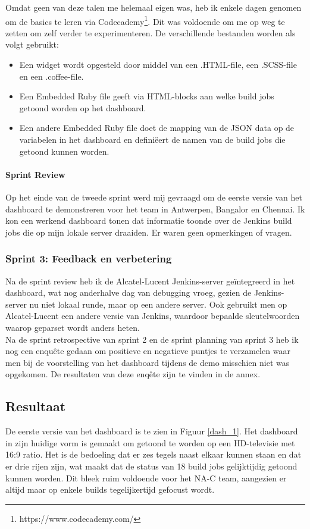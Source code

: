 \documentclass[10pt,a4paper]{article}
\begin{document}
Omdat geen van deze talen me helemaal eigen was, heb ik enkele dagen genomen om de basics te leren via Codecademy\footnote{https://www.codecademy.com/}. Dit was voldoende om me op weg te zetten om zelf verder te experimenteren. 
De verschillende bestanden worden als volgt gebruikt:
\begin{itemize}
\item Een widget wordt opgesteld door middel van een .HTML-file, een .SCSS-file en een .coffee-file.
\item Een Embedded Ruby file geeft via HTML-blocks aan welke build jobs getoond worden op het dashboard.
\item Een andere Embedded Ruby file doet de mapping van de JSON data op de variabelen in het dashboard en defini\"eert de namen van de build jobs die getoond kunnen worden.
\end{itemize}
\paragraph{Sprint Review} Op het einde van de tweede sprint werd mij gevraagd om de eerste versie van het dashboard te demonstreren voor het team in Antwerpen, Bangalor en Chennai. Ik kon een werkend dashboard tonen dat informatie toonde over de Jenkins build jobs die op mijn lokale server draaiden. Er waren geen opmerkingen of vragen.
\subsubsection{Sprint 3: Feedback en verbetering}
\label{sprint3}
Na de sprint review heb ik de Alcatel-Lucent Jenkins-server ge\"integreerd in het dashboard, wat nog anderhalve dag van debugging vroeg, gezien de Jenkins-server nu niet lokaal runde, maar op een andere server. Ook gebruikt men op Alcatel-Lucent een andere versie van Jenkins, waardoor bepaalde sleutelwoorden waarop geparset wordt anders heten.\\
Na de sprint retrospective van sprint 2 en de sprint planning van sprint 3 heb ik nog een enqu\^ete gedaan om positieve en negatieve puntjes te verzamelen waar men bij de voorstelling van het dashboard tijdens de demo misschien niet was opgekomen. De resultaten van deze enq\^ete zijn te vinden in de annex.
\subsection{Resultaat}
De eerste versie van het dashboard is te zien in Figuur \ref{dash_1}. Het dashboard in zijn huidige vorm is gemaakt om getoond te worden op een HD-televisie met 16:9 ratio. Het is de bedoeling dat er zes tegels naast elkaar kunnen staan en dat er drie rijen zijn, wat maakt dat de status van 18 build jobs gelijktijdig getoond kunnen worden. Dit bleek ruim voldoende voor het NA-C team, aangezien er altijd maar op enkele builds tegelijkertijd gefocust wordt.
\end{document}
